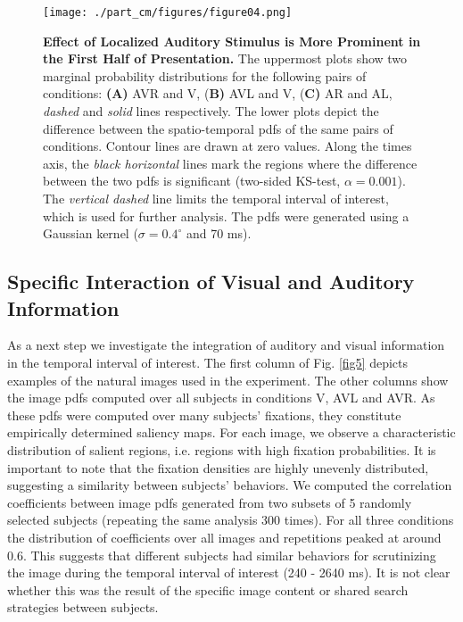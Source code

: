 \begin{figure}[!htbp] \centerline{ \texttt{[image: ./part\_cm/figures/figure04.png]}}
\caption[Effect of Localized Auditory Stimulus is More Prominent in the
First Half of Presentation.]{ \textbf{Effect of Localized Auditory Stimulus
is More Prominent in the First Half of Presentation.} The uppermost plots
show two marginal probability distributions for the following pairs of
conditions: \textbf{(A)} AVR and V, (\textbf{B)} AVL and V, (\textbf{C)} AR
and AL, \textit{dashed} and \textit{solid} lines respectively. The lower
plots depict the difference between the spatio-temporal pdfs of the same
pairs of conditions. Contour lines are drawn at zero values. Along the
times axis, the \textit{black horizontal} lines mark the regions where the
difference between the two pdfs is significant (two-sided KS-test,
$\alpha=0.001$). The \textit{vertical dashed} line limits the temporal
interval of interest, which is used for further analysis. The pdfs were
generated using a Gaussian kernel ($\sigma = 0.4^{\circ}$ and 70 ms). }
\label{fig4}\end{figure}



\subsection{Specific Interaction of Visual and Auditory Information}

As a next step we investigate the integration of auditory and visual
information in the temporal interval of interest. The first column of
Fig. \ref{fig5} depicts examples of the natural \newpage images used in the experiment.
The other columns show the image pdfs computed over all subjects in
conditions V, AVL and AVR. As these pdfs were computed over many subjects'
fixations, they constitute empirically determined saliency maps. For each
image, we observe a characteristic distribution of salient regions, i.e.
regions with high fixation probabilities. It is important to note that the
fixation densities are highly unevenly distributed, suggesting a similarity
between subjects' behaviors. We computed the correlation coefficients
between image pdfs generated from two subsets of 5 randomly selected
subjects (repeating the same analysis 300 times). For all three conditions
the distribution of coefficients over all images and repetitions peaked at
around 0.6. This suggests that different subjects had similar behaviors for
scrutinizing the image during the temporal interval of interest (240 - 2640
ms). It is not clear whether this was the result of the specific image
content or shared search strategies between subjects.

